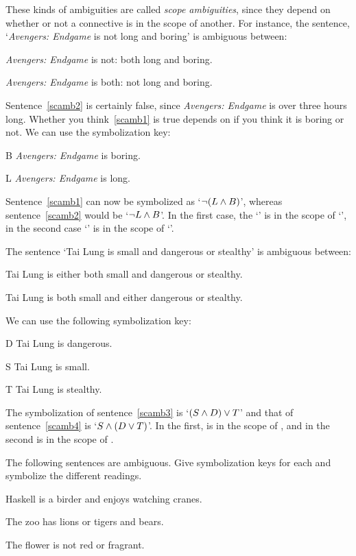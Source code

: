 These kinds of ambiguities are called \emph{scope ambiguities}, since they depend on whether or not a connective is in the scope of another. For instance, the sentence, `\emph{Avengers: Endgame} is not long and boring' is ambiguous between:
\begin{earg}
	\item[\ex{scamb1}] \emph{Avengers: Endgame} is not: both long and boring.
	\item[\ex{scamb2}] \emph{Avengers: Endgame} is both: not long and boring.
\end{earg}
Sentence~\ref{scamb2} is certainly false, since \emph{Avengers: Endgame} is over three hours long. Whether you think~\ref{scamb1} is true depends on if you think it is boring or not. We can use the symbolization key:
\begin{ekey}
	\item[B] \emph{Avengers: Endgame} is boring.
	\item[L] \emph{Avengers: Endgame} is long.
\end{ekey}
Sentence~\ref{scamb1} can now be symbolized as `$\neg(L \mathbin{\wedge} B)$', whereas sentence~\ref{scamb2} would be `$\neg L \mathbin{\wedge} B$'. In the first case, the `\eand' is in the scope of `\enot', in the second case `\enot' is in the scope of `\eand'.

The sentence `Tai Lung is small and dangerous or stealthy' is ambiguous between:
\begin{earg}
	\item[\ex{scamb3}] Tai Lung is either both small and dangerous or stealthy.
	\item[\ex{scamb4}] Tai Lung is both small and either dangerous or stealthy.
\end{earg}
We can use the following symbolization key:
\begin{ekey}
	\item[D] Tai Lung is dangerous.
	\item[S] Tai Lung is small.
	\item[T] Tai Lung is stealthy.
\end{ekey}
The symbolization of sentence~\ref{scamb3} is `$(S \mathbin{\wedge} D) \vee T$' and that of sentence~\ref{scamb4} is `$S \mathbin{\wedge} (D \vee T)$'. In the first, \eand is in the scope of \eor, and in the second \eor is in the scope of \eand.

\begin{practiceproblems}
\solutions
\problempart The following sentences are ambiguous. Give symbolization keys for each and symbolize the different readings.
\begin{earg}
	\item Haskell is a birder and enjoys watching cranes.
	\item The zoo has lions or tigers and bears.
	\item The flower is not red or fragrant.
\end{earg}
\end{practiceproblems}



